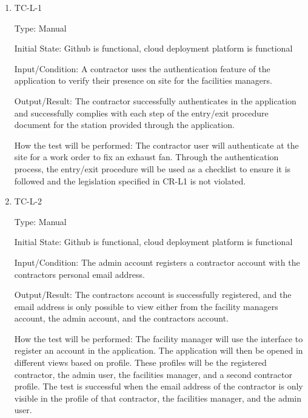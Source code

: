 \documentclass[12pt, titlepage]{article}
\begin{document}
\begin{enumerate}

  \item{TC-L-1\\}

    Type: Manual

    Initial State: Github is functional, cloud deployment platform is functional

    Input/Condition: A contractor uses the authentication feature of
    the application
    to verify their presence on site for the facilities managers.

    Output/Result: The contractor successfully authenticates in the application
    and successfully complies with each step of the entry/exit
    procedure document
    for the station provided through the application.

    How the test will be performed: The contractor user will authenticate at the
    site for a work order to fix an exhaust fan. Through the
    authentication process,
    the entry/exit procedure will be used as a checklist to ensure it
    is followed
    and the legislation specified in CR-L1 is not violated.

  \item{TC-L-2\\}

    Type: Manual

    Initial State: Github is functional, cloud deployment platform is functional

    Input/Condition: The admin account registers a contractor account with the
    contractors personal email address.

    Output/Result: The contractors account is successfully
    registered, and the email
    address is only possible to view either from the facility managers
    account, the admin
    account, and the contractors account.

    How the test will be performed: The facility manager will use the
    interface to
    register an account in the application. The application will then
    be opened in
    different views based on profile. These profiles will be the
    registered contractor,
    the admin user, the facilities manager, and a second contractor profile.
    The test is successful when the email address of the contractor is only
    visible in the profile of that contractor, the facilities manager,
    and the admin user.

\end{enumerate}
\end{document}
